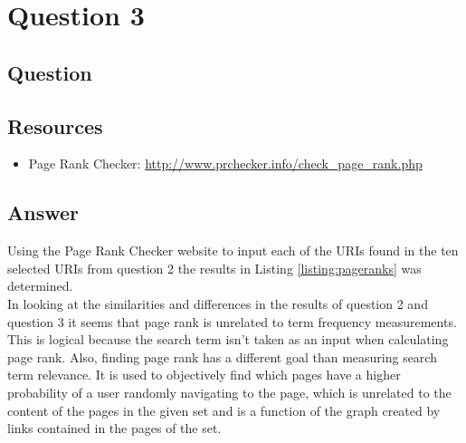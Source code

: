 \section{Question 3}

\subsection{Question}


\subsection{Resources}
\begin{itemize}
\item Page Rank Checker: \url{http://www.prchecker.info/check_page_rank.php}
\end{itemize}

\subsection{Answer}
Using the Page Rank Checker website to input each of the URIs found in the ten selected URIs from question 2 the results in Listing \ref{listing:pageranks} was determined.\\



In looking at the similarities and differences in the results of question 2 and question 3 it seems that page rank is unrelated to term frequency measurements. This is logical because the search term isn't taken as an input when calculating page rank. Also, finding page rank has a different goal than measuring search term relevance. It is used to objectively find which pages have a higher probability of a user randomly navigating to the page, which is unrelated to the content of the pages in the given set and is a function of the graph created by links contained in the pages of the set.